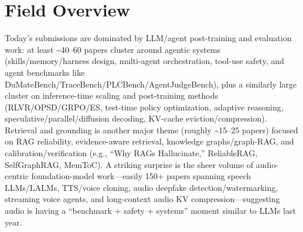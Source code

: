 \documentclass[12pt,letterpaper]{article}
\begin{document}
\section*{Field Overview}
{\footnotesize Today's submissions are dominated by LLM/agent post-training and evaluation work: at least \textasciitilde{}40--60 papers cluster around agentic systems (skills/memory/harness design, multi-agent orchestration, tool-use safety, and agent benchmarks like DuMateBench/TraceBench/PLCBench/AgentJudgeBench), plus a similarly large cluster on inference-time scaling and post-training methods (RLVR/OPSD/GRPO/ES, test-time policy optimization, adaptive reasoning, speculative/parallel/diffusion decoding, KV-cache eviction/compression). Retrieval and grounding is another major theme (roughly \textasciitilde{}15--25 papers) focused on RAG reliability, evidence-aware retrieval, knowledge graphs/graph-RAG, and calibration/verification (e.g., ``Why RAGs Hallucinate,'' ReliableRAG, SelfGraphRAG, MemToC). A striking surprise is the sheer volume of audio-centric foundation-model work---easily 150+ papers spanning speech LLMs/LALMs, TTS/voice cloning, audio deepfake detection/watermarking, streaming voice agents, and long-context audio KV compression---suggesting audio is having a ``benchmark + safety + systems'' moment similar to LLMs last year.}
\end{document}
